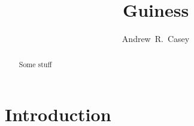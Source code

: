 \documentclass[preprint]{aastex}
\begin{document}
\title{Guiness}

\author{
  Andrew~R.~Casey
}


\begin{abstract}
  Some stuff
\end{abstract}




\section{Introduction} 
\label{sec:introduction}
\end{document}

